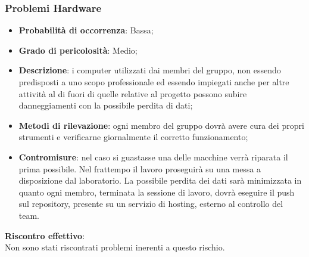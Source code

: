 		\subsubsection{Problemi Hardware} %
		\label{ssub:problemi_hardware}
			\begin{itemize}
				\item \textbf{Probabilità di occorrenza}: Bassa;
				\item \textbf{Grado di pericolosità}: Medio;
				\item \textbf{Descrizione}: i computer utilizzati dai membri del gruppo, non essendo predisposti a uno scopo professionale ed essendo impiegati anche per altre attività al di fuori di quelle relative al progetto possono subire danneggiamenti con la possibile perdita di dati;
				\item \textbf{Metodi di rilevazione}: ogni membro del gruppo dovrà avere cura dei propri strumenti e verificarne giornalmente il corretto funzionamento;
				\item \textbf{Contromisure}: nel caso si guastasse una delle macchine verrà riparata il prima possibile. Nel frattempo il lavoro proseguirà su una messa a disposizione dal laboratorio. La possibile perdita dei dati sarà minimizzata in quanto ogni membro, terminata la sessione di lavoro, dovrà eseguire il push sul repository\gloss{}, presente su un servizio di hosting, esterno al controllo del team.
			\end{itemize}
		\noindent
		\textbf{Riscontro effettivo}: \\
		Non sono stati riscontrati problemi inerenti a questo rischio.
		
